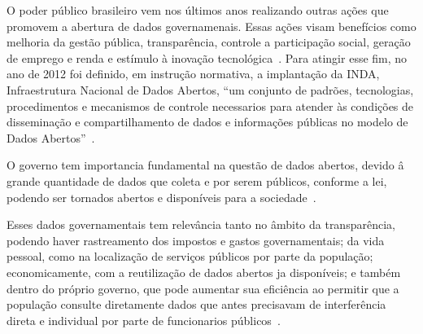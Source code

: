 O poder público brasileiro vem nos últimos anos realizando outras ações que promovem a abertura de dados governamenais. Essas ações visam benefícios como melhoria da gestão pública, transparência, controle a participação social, geração de emprego e renda e estímulo à inovação tecnológica~\cite{tcu}. Para atingir esse fim, no ano de 2012 foi definido, em instrução normativa, a implantação da INDA, Infraestrutura Nacional de Dados Abertos, \enquote{um conjunto de padrões, tecnologias, procedimentos e mecanismos de controle necessarios para atender às condições de disseminação e compartilhamento de dados e informações públicas no modelo de Dados Abertos}~\cite{inda}.  

O governo tem importancia fundamental na questão de dados abertos, devido â grande quantidade de dados que coleta e por serem públicos, conforme a lei, podendo ser tornados abertos e disponíveis para a sociedade~\cite{openknowledge}.

Esses dados governamentais tem relevância tanto no âmbito da transparência, podendo haver rastreamento dos impostos e gastos governamentais; da vida pessoal, como na localização de serviços públicos por parte da população; economicamente, com a reutilização de dados abertos ja disponíveis; e também dentro do próprio governo, que pode aumentar sua eficiência ao permitir que a população consulte diretamente dados que antes precisavam de interferência direta e individual por parte de funcionarios públicos~\cite{openknowledge}.









